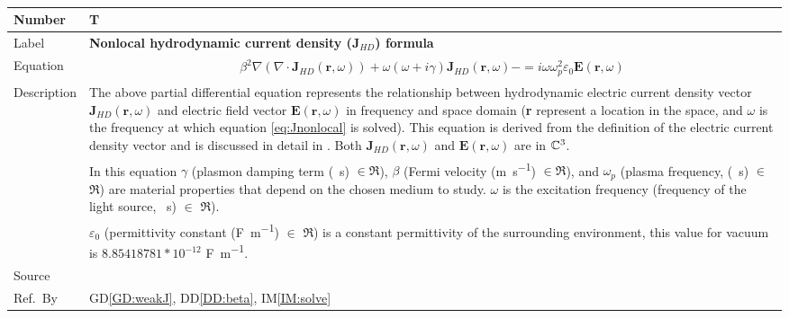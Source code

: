 \documentclass[12pt]{article}
\newcommand{\colBwidth}{0.82\textwidth} \newcommand{\colCwidth}{0.1\textwidth}
\begin{document}
	~\newline \noindent \begin{minipage}{\textwidth}
		\renewcommand*{\arraystretch}{1.5} \begin{tabular}{| p{\colAwidth} |
				p{\colBwidth}|} \hline \rowcolor[gray]{0.9} Number&
			T{theorynum}\thetheorynum \label{TM:J}\\ \hline Label&\bf
			Nonlocal hydrodynamic current density (J$_{HD}$) formula \\ \hline Equation&
			\begin{equation} \label{eq:Jnonlocal} \begin{gathered}
					\beta^2 \nabla( \nabla \cdot \textbf{J}_{HD}(\textbf{r},\omega))	+
					\omega ( \omega + i \gamma ) \textbf{J}_{HD}(\textbf{r},\omega) -
					 =
					i \omega \omega_p^2 \varepsilon_{0} \textbf{E}(\textbf{r},\omega) \end{gathered}  \end{equation} \\
			
			
			\hline Description & The above partial differential equation represents the
			relationship between hydrodynamic electric current density vector
			$\textbf{J}_{HD}(\textbf{r},\omega)$ and electric field vector
			$\textbf{E}(\textbf{r},\omega)$ in frequency and space domain (\textbf{r} represent a location in the space, and $\omega$ is the frequency at which equation \ref{eq:Jnonlocal} is solved). This equation is derived
			from the definition of the electric current density vector and is discussed in detail in
			\cite{hiremath2012numerical}. Both $\textbf{J}_{HD}(\textbf{r},\omega)$ and
			$\textbf{E}(\textbf{r},\omega)$ are in $\Bbb C^3$.\\ & In this equation $\gamma$
			(plasmon damping term (\si{\per \second}) $\in \Re$), $\beta$ (Fermi
			velocity (\si{\meter \per \second}) $\in \Re$), and $\omega_p$ (plasma
			frequency, (\si{\per \second}) $\in$ $\Re$) are material properties that
			depend on the chosen medium to study. $\omega$ is the excitation frequency (frequency of the light source, \si{\per \second}) $\in$ $\Re$). \\ & $\varepsilon_0$ (permittivity
			constant (\si{\farad \per \meter}) $\in$ $\Re$) is a constant permittivity of the surrounding environment, this value for vacuum is
			$8.85418781*10^{-12}$ \si{\farad \per \meter}. \\ \hline Source &
			\cite{hiremath2012numerical} \\ %
			\hline Ref.\ By & GD\ref{GD:weakJ}, DD\ref{DD:beta}, IM\ref{IM:solve}\\ \hline
	\end{tabular} \end{minipage}\\
	
\end{document}
